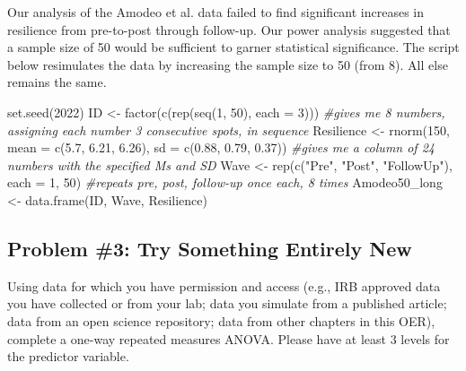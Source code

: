 \documentclass[
  11pt,
]{book}
\newenvironment{Shaded}{\begin{snugshade}}{\end{snugshade}}
\newcommand{\AttributeTok}[1]{\textcolor[rgb]{0.77,0.63,0.00}{#1}}
\newcommand{\CommentTok}[1]{\textcolor[rgb]{0.56,0.35,0.01}{\textit{#1}}}
\newcommand{\DecValTok}[1]{\textcolor[rgb]{0.00,0.00,0.81}{#1}}
\newcommand{\FloatTok}[1]{\textcolor[rgb]{0.00,0.00,0.81}{#1}}
\newcommand{\FunctionTok}[1]{\textcolor[rgb]{0.00,0.00,0.00}{#1}}
\newcommand{\NormalTok}[1]{#1}
\newcommand{\OtherTok}[1]{\textcolor[rgb]{0.56,0.35,0.01}{#1}}
\newcommand{\StringTok}[1]{\textcolor[rgb]{0.31,0.60,0.02}{#1}}
\begin{document}
Our analysis of the Amodeo et al. \citep{amodeo_empowering_2018} data failed to find significant increases in resilience from pre-to-post through follow-up. Our power analysis suggested that a sample size of 50 would be sufficient to garner statistical significance. The script below resimulates the data by increasing the sample size to 50 (from 8). All else remains the same.

\begin{Shaded}
\begin{Highlighting}[]
\FunctionTok{set.seed}\NormalTok{(}\DecValTok{2022}\NormalTok{)}
\NormalTok{ID }\OtherTok{\textless{}{-}} \FunctionTok{factor}\NormalTok{(}\FunctionTok{c}\NormalTok{(}\FunctionTok{rep}\NormalTok{(}\FunctionTok{seq}\NormalTok{(}\DecValTok{1}\NormalTok{, }\DecValTok{50}\NormalTok{), }\AttributeTok{each =} \DecValTok{3}\NormalTok{)))  }\CommentTok{\#gives me 8 numbers, assigning each number 3 consecutive spots, in sequence}
\NormalTok{Resilience }\OtherTok{\textless{}{-}} \FunctionTok{rnorm}\NormalTok{(}\DecValTok{150}\NormalTok{, }\AttributeTok{mean =} \FunctionTok{c}\NormalTok{(}\FloatTok{5.7}\NormalTok{, }\FloatTok{6.21}\NormalTok{, }\FloatTok{6.26}\NormalTok{), }\AttributeTok{sd =} \FunctionTok{c}\NormalTok{(}\FloatTok{0.88}\NormalTok{, }\FloatTok{0.79}\NormalTok{,}
    \FloatTok{0.37}\NormalTok{))  }\CommentTok{\#gives me a column of 24 numbers with the specified Ms and SD}
\NormalTok{Wave }\OtherTok{\textless{}{-}} \FunctionTok{rep}\NormalTok{(}\FunctionTok{c}\NormalTok{(}\StringTok{"Pre"}\NormalTok{, }\StringTok{"Post"}\NormalTok{, }\StringTok{"FollowUp"}\NormalTok{), }\AttributeTok{each =} \DecValTok{1}\NormalTok{, }\DecValTok{50}\NormalTok{)  }\CommentTok{\#repeats pre, post, follow{-}up once each, 8 times}
\NormalTok{Amodeo50\_long }\OtherTok{\textless{}{-}} \FunctionTok{data.frame}\NormalTok{(ID, Wave, Resilience)}
\end{Highlighting}
\end{Shaded}

\hypertarget{problem-3-try-something-entirely-new}{%
\subsection{Problem \#3: Try Something Entirely New}\label{problem-3-try-something-entirely-new}}

Using data for which you have permission and access (e.g., IRB approved data you have collected or from your lab; data you simulate from a published article; data from an open science repository; data from other chapters in this OER), complete a one-way repeated measures ANOVA. Please have at least 3 levels for the predictor variable.
\end{document}
